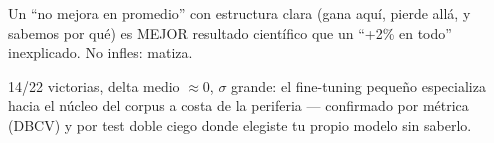 \documentclass[11pt,a4paper]{article}
\begin{document}
\begin{ojo}
Un ``no mejora en promedio'' con estructura clara (gana aquí, pierde allá, y sabemos por
qué) es MEJOR resultado científico que un ``+2\% en todo'' inexplicado. No infles: matiza.
\end{ojo}

\begin{resumen}
14/22 victorias, delta medio $\approx 0$, $\sigma$ grande: el fine-tuning pequeño
especializa hacia el núcleo del corpus a costa de la periferia — confirmado por métrica
(DBCV) y por test doble ciego donde elegiste tu propio modelo sin saberlo.
\end{resumen}
\end{document}

